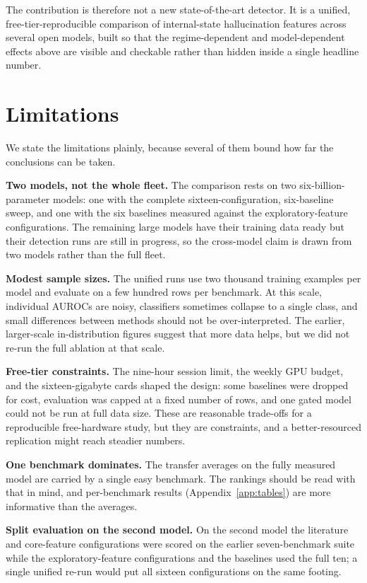 The contribution is therefore not a new state-of-the-art detector. It is a unified,
free-tier-reproducible comparison of internal-state hallucination features across several open
models, built so that the regime-dependent and model-dependent effects above are visible and
checkable rather than hidden inside a single headline number.

\section{Limitations}

We state the limitations plainly, because several of them bound how far the conclusions can
be taken.

\textbf{Two models, not the whole fleet.} The comparison rests on two six-billion-parameter
models: one with the complete sixteen-configuration, six-baseline sweep, and one with the six
baselines measured against the exploratory-feature configurations. The remaining large models
have their training data ready but their detection runs are still in progress, so the
cross-model claim is drawn from two models rather than the full fleet.

\textbf{Modest sample sizes.} The unified runs use two thousand training examples per model
and evaluate on a few hundred rows per benchmark. At this scale, individual AUROCs are noisy,
classifiers sometimes collapse to a single class, and small differences between methods should
not be over-interpreted. The earlier, larger-scale in-distribution figures suggest that more
data helps, but we did not re-run the full ablation at that scale.

\textbf{Free-tier constraints.} The nine-hour session limit, the weekly GPU budget, and the
sixteen-gigabyte cards shaped the design: some baselines were dropped for cost, evaluation was
capped at a fixed number of rows, and one gated model could not be run at full data size.
These are reasonable trade-offs for a reproducible free-hardware study, but they are
constraints, and a better-resourced replication might reach steadier numbers.

\textbf{One benchmark dominates.} The transfer averages on the fully measured model are
carried by a single easy benchmark. The rankings should be read with that in mind, and
per-benchmark results (Appendix~\ref{app:tables}) are more informative than the averages.

\textbf{Split evaluation on the second model.} On the second model the literature and
core-feature configurations were scored on the earlier seven-benchmark suite while the
exploratory-feature configurations and the baselines used the full ten; a single unified
re-run would put all sixteen configurations on the same footing.

